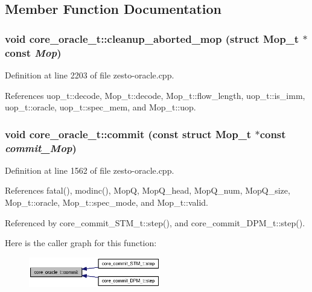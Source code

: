 \subsection{Member Function Documentation}
\subsubsection[{cleanup\_\-aborted\_\-mop}]{\setlength{\rightskip}{0pt plus 5cm}void core\_\-oracle\_\-t::cleanup\_\-aborted\_\-mop (struct {\bf Mop\_\-t} $\ast$const  {\em Mop})\hspace{0.3cm}{\tt  [protected]}}\label{classcore__oracle__t_ba04cbb4ec9ba6ffb03455a2f5c5da32}




Definition at line 2203 of file zesto-oracle.cpp.

References uop\_\-t::decode, Mop\_\-t::decode, Mop\_\-t::flow\_\-length, uop\_\-t::is\_\-imm, uop\_\-t::oracle, uop\_\-t::spec\_\-mem, and Mop\_\-t::uop.
\subsubsection[{commit}]{\setlength{\rightskip}{0pt plus 5cm}void core\_\-oracle\_\-t::commit (const struct {\bf Mop\_\-t} $\ast$const  {\em commit\_\-Mop})}\label{classcore__oracle__t_5656906c0caee72b39f9d3760341de99}




Definition at line 1562 of file zesto-oracle.cpp.

References fatal(), modinc(), MopQ, MopQ\_\-head, MopQ\_\-num, MopQ\_\-size, Mop\_\-t::oracle, Mop\_\-t::spec\_\-mode, and Mop\_\-t::valid.

Referenced by core\_\-commit\_\-STM\_\-t::step(), and core\_\-commit\_\-DPM\_\-t::step().

Here is the caller graph for this function:\nopagebreak
\begin{figure}[H]
\begin{center}
\leavevmode
\includegraphics[width=163pt]{classcore__oracle__t_5656906c0caee72b39f9d3760341de99_icgraph}
\end{center}
\end{figure}
